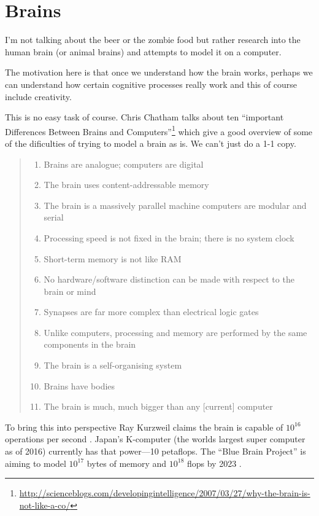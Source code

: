 \documentclass[11pt]{thesis} %
\begin{document}


\section{Brains}

I'm not talking about the beer or the zombie food but rather research into the human brain (or animal brains) and attempts to model it on a computer. 

The motivation here is that once we understand how the brain works, perhaps we can understand how certain cognitive processes really work and this of course include creativity.

This is no easy task of course. Chris Chatham talks about ten ``important Differences Between Brains and Computers''\footnote{\url{http://scienceblogs.com/developingintelligence/2007/03/27/why-the-brain-is-not-like-a-co/}} which give a good overview of some of the dificulties of trying to model a brain as is. We can't just do a 1-1 copy.

\begin{quotation}
  \begin{enumerate}
    \item Brains are analogue; computers are digital
    \item The brain uses content-addressable memory
    \item The brain is a massively parallel machine computers are modular and serial
    \item Processing speed is not fixed in the brain; there is no system clock
    \item Short-term memory is not like RAM
    \item No hardware/software distinction can be made with respect to the brain or mind
    \item Synapses are far more complex than electrical logic gates
    \item Unlike computers, processing and memory are performed by the same components in the brain
    \item The brain is a self-organising system
    \item Brains have bodies
    \item	The brain is much, much bigger than any [current] computer
  \end{enumerate}
\end{quotation}

To bring this into perspective Ray Kurzweil claims the brain is capable of $10^{16}$ operations per second \citeyear[p.194]{Kurzweil2013}. Japan's K-computer (the worlds largest super computer as of 2016) currently has that power---10 petaflops. The ``Blue Brain Project'' is aiming to model $10^17$ bytes of memory and $10^{18}$ flops by 2023 \autocite[p.125]{Kurzweil2013}.
\end{document}
